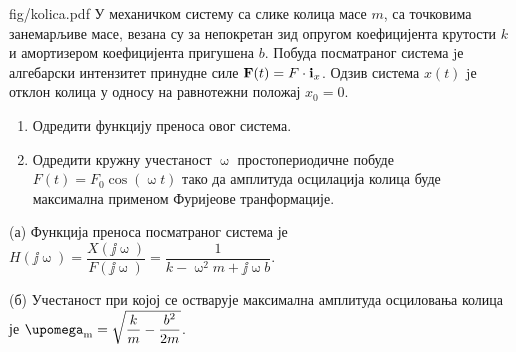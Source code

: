 \begin{slikaDesno}{fig/kolica.pdf}
    \PID
    У механичком систему са слике колица масе $m$, са точковима занемарљиве масе, 
    везана су за непокретан зид опругом коефицијента крутости $k$ и амортизером 
    коефицијента пригушена $b$. Побуда посматраног система jе алгебарски
    интензитет принудне силе 
    ${\bf F} (t) = F \cdot {\bf i}_x$. Одзив система $x(t)$ jе отклон колица 
    у односу на равнотежни положај $x_0 = 0$.
\end{slikaDesno}
\begin{enumerate}[label=(\alph*)]
    \item Одредити  функцију
    преноса овог система. 
    \item Одредити кружну учестаност $\upomega$ простопериодичне побуде
    $F(t) = F_0 \cos(\upomega t)$ тако да амплитуда осцилација колица буде максимална
    применом Фуријеове транформације.
\end{enumerate}

\REZULTAT
(а) Функција преноса посматраног система је 
$H(\jj\upomega) = \dfrac{X(\jj\upomega)}{F(\jj\upomega)} = 
\dfrac{1}{k - \upomega^2 m + \jj\upomega b}$.

(б) Учестаност при којој се остварује максимална амплитуда осциловања колица је
$\upomega_{\rm m} = 
\sqrt{
    \dfrac{k}{m}
    -
    \dfrac{b^2}{2m}
}$.